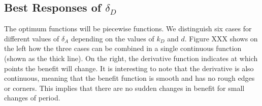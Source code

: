 %
%
%
%
%
%
%

\subsection{Best Responses of $\delta_{D}$}
The optimum functions will be piecewise functions. We distinguish six cases for different values of $\delta_{A}$ depending on the values of $k_{D}$ and $d$. 
Figure XXX shows on the left how the three cases can be combined in a single continuous function (shown as the thick line). On the right, the derivative function indicates at which points the benefit will change. It is interesting to note that the derivative is also continuous, meaning that the benefit function is smooth and has no rough edges or corners. This implies that there are no sudden changes in benefit for small changes of period.

